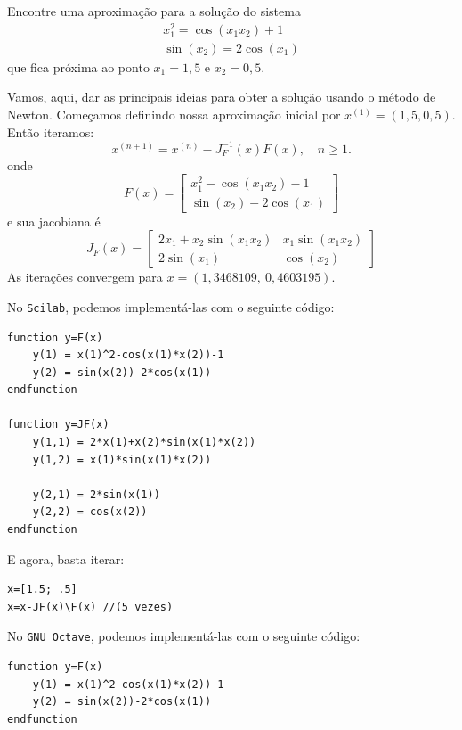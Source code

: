 \begin{ex} Encontre uma aproximação para a solução do sistema
\begin{eqnarray*}
x_1^2=\cos(x_1x_2)+1\\
\sin(x_2)=2\cos(x_1)
\end{eqnarray*}
que fica próxima ao ponto $x_1=1,5$ e $x_2=0,5$.
\end{ex}
\begin{sol} Vamos, aqui, dar as principais ideias para obter a solução usando o método de Newton.
Começamos definindo nossa aproximação inicial por $x^{(1)} = (1,5, 0,5)$. Então iteramos:
\begin{equation*}
  x^{(n+1)} = x^{(n)} - J_F^{-1}(x)F(x), \quad n\geq 1.
\end{equation*}
onde
  \begin{equation*}
    F(x)=\left[\begin{array}{c}
        \displaystyle x_1^2-\cos(x_1x_2)-1\\
        \displaystyle \sin(x_2)-2\cos(x_1)
      \end{array}\right]
  \end{equation*}
e sua jacobiana é
\begin{equation*}
  J_F(x) = \left[\begin{array}{cc}
    \displaystyle 2x_1 +x_2\sin(x_1x_2) & x_1\sin(x_1x_2)\\
    \displaystyle 2\sin(x_1) & \cos(x_2)
  \end{array}\right]
\end{equation*}
As iterações convergem para $x = (1,3468109,~0,4603195)$.

\ifisscilab
No \verb+Scilab+, podemos implementá-las com o seguinte código:
\begin{verbatim}
function y=F(x)
    y(1) = x(1)^2-cos(x(1)*x(2))-1
    y(2) = sin(x(2))-2*cos(x(1))
endfunction

function y=JF(x)
    y(1,1) = 2*x(1)+x(2)*sin(x(1)*x(2))
    y(1,2) = x(1)*sin(x(1)*x(2))

    y(2,1) = 2*sin(x(1))
    y(2,2) = cos(x(2))
endfunction
\end{verbatim}

E agora, basta iterar:
\begin{verbatim}
x=[1.5; .5]
x=x-JF(x)\F(x) //(5 vezes)
\end{verbatim}
\fi
\ifisoctave
No \verb+GNU Octave+, podemos implementá-las com o seguinte código:
\begin{verbatim}
function y=F(x)
    y(1) = x(1)^2-cos(x(1)*x(2))-1
    y(2) = sin(x(2))-2*cos(x(1))
endfunction


\end{verbatim}
\end{sol}
